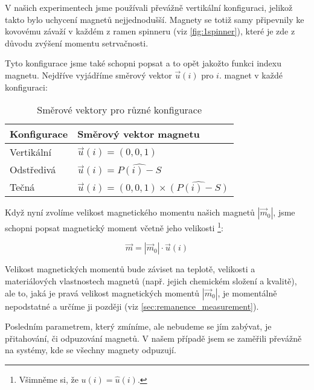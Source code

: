 V našich experimentech jsme používali převážně vertikální konfiguraci, jelikož takto bylo uchycení magnetů nejjednodušší.
Magnety se totiž samy připevnily ke kovovému závaží v každém z ramen spinneru (viz \autoref{fig:1spinner}), které je zde z důvodu zvýšení momentu setrvačnosti.

Tyto konfigurace jsme také schopni popsat a to opět jakožto funkci indexu magnetu.
Nejdříve vyjádříme směrový vektor $\vec{u}(i)$ pro $i$. magnet v každé konfiguraci:

\vspace{24pt}

\begin{table}[!ht]
    \captionsetup{justification=raggedright,singlelinecheck=off}
    \caption{Směrové vektory pro různé konfigurace}
    \label{tab:mag_dir_vec}

    \def\arraystretch{1.5}
    \begin{tabularx}{\textwidth}{p{} p{} }
        \textbf{Konfigurace} & \textbf{Směrový vektor magnetu}                    \\
        \hline
        Vertikální           & $\vec{u}(i) = (0,0,1)$                             \\
        Odstředivá           & $\vec{u}(i) = \widehat{P(i) - S}$                  \\
        Tečná                & $\vec{u}(i) = (0,0,1) \times \widehat{(P(i) - S)}$ \\
    \end{tabularx}
\end{table}

{\raggedright
Když nyní zvolíme velikost magnetického momentu našich magnetů $|\vec{m}_0|$, jsme schopni popsat magnetický moment včetně jeho velikosti \footnote{Všimněme si, že $u(i) = \hat{u}(i)$.}:}

\begin{equation}
    \label{eq:magnet_moment_orientation}
    \vec{m} = |\vec{m}_0| \cdot \vec{u}(i)
\end{equation}

Velikost magnetických momentů bude záviset na teplotě, velikosti a materiálových vlastnostech magnetů (např. jejich chemickém složení a kvalitě), ale to, jaká je pravá velikost magnetických momentů $|\vec{m}_0|$, je momentálně nepodstatné a určíme ji později (viz \autoref{sec:remanence_measurement}).

Posledním parametrem, který zmíníme, ale nebudeme se jím zabývat, je přitahování, či odpuzování magnetů.
V našem případě jsem se zaměřili převážně na systémy, kde se všechny magnety odpuzují.

